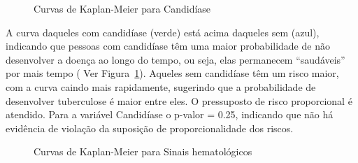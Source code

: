 \documentclass[
  letterpaper,
  DIV=11,
  numbers=noendperiod]{scrreprt}
\begin{document}
\begin{figure}

\caption{\label{fig-fig6}Curvas de Kaplan-Meier para Candidíase}


\end{figure}%

A curva daqueles com candidíase (verde) está acima daqueles sem (azul),
indicando que pessoas com candidíase têm uma maior probabilidade de não
desenvolver a doença ao longo do tempo, ou seja, elas permanecem
``saudáveis'' por mais tempo ( Ver Figura~\ref{fig-fig6}). Aqueles sem
candidíase têm um risco maior, com a curva caindo mais rapidamente,
sugerindo que a probabilidade de desenvolver tuberculose é maior entre
eles. O pressuposto de risco proporcional é atendido. Para a variável
Candidíase o p-valor = 0.25, indicando que não há evidência de violação
da suposição de proporcionalidade dos riscos.

\begin{figure}

\caption{\label{fig-fig7}Curvas de Kaplan-Meier para Sinais
hematológicos}


\end{figure}%
\end{document}
